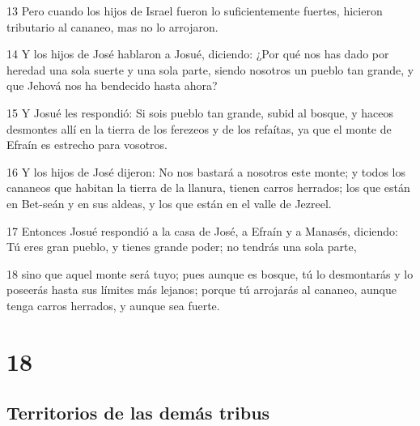 \par 13 Pero cuando los hijos de Israel fueron lo suficientemente fuertes, hicieron tributario al cananeo, mas no lo arrojaron. 
\par 14 Y los hijos de José hablaron a Josué, diciendo: ¿Por qué nos has dado por heredad una sola suerte y una sola parte, siendo nosotros un pueblo tan grande, y que Jehová nos ha bendecido hasta ahora?
\par 15 Y Josué les respondió: Si sois pueblo tan grande, subid al bosque, y haceos desmontes allí en la tierra de los ferezeos y de los refaítas, ya que el monte de Efraín es estrecho para vosotros.
\par 16 Y los hijos de José dijeron: No nos bastará a nosotros este monte; y todos los cananeos que habitan la tierra de la llanura, tienen carros herrados; los que están en Bet-seán y en sus aldeas, y los que están en el valle de Jezreel.
\par 17 Entonces Josué respondió a la casa de José, a Efraín y a Manasés, diciendo: Tú eres gran pueblo, y tienes grande poder; no tendrás una sola parte,
\par 18 sino que aquel monte será tuyo; pues aunque es bosque, tú lo desmontarás y lo poseerás hasta sus límites más lejanos; porque tú arrojarás al cananeo, aunque tenga carros herrados, y aunque sea fuerte.

\chapter{18}

\section*{Territorios de las demás tribus}

